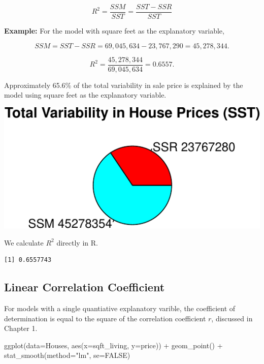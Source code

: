 \documentclass[
  letterpaper,
  DIV=11,
  numbers=noendperiod]{scrreprt}
\newenvironment{Shaded}{\begin{snugshade}}{\end{snugshade}}
\newcommand{\AttributeTok}[1]{\textcolor[rgb]{0.40,0.45,0.13}{#1}}
\newcommand{\ConstantTok}[1]{\textcolor[rgb]{0.56,0.35,0.01}{#1}}
\newcommand{\FunctionTok}[1]{\textcolor[rgb]{0.28,0.35,0.67}{#1}}
\newcommand{\NormalTok}[1]{\textcolor[rgb]{0.00,0.23,0.31}{#1}}
\newcommand{\SpecialCharTok}[1]{\textcolor[rgb]{0.37,0.37,0.37}{#1}}
\newcommand{\StringTok}[1]{\textcolor[rgb]{0.13,0.47,0.30}{#1}}
\begin{document}
\[
R^2=\frac{SSM}{SST}= \frac{SST-SSR}{SST}
\]

\textbf{Example:} For the model with square feet as the explanatory
variable,

\[
SSM = SST-SSR = 69,045,634 - 23,767,290 =45,278,344.
\]

\[
R^2 = \frac{45,278,344}{69,045,634}=0.6557.
\]

Approximately 65.6\% of the total variability in sale price is explained
by the model using square feet as the explanatory variable.

\includegraphics{Ch2_files/figure-pdf/unnamed-chunk-28-1.pdf}

We calculate \(R^2\) directly in R.

\begin{Shaded}
\end{Shaded}

\begin{verbatim}
[1] 0.6557743
\end{verbatim}

\subsection{Linear Correlation
Coefficient}\label{linear-correlation-coefficient}

For models with a single quantiative explanatory varible, the
coefficient of determination is equal to the square of the correlation
coefficient \(r\), discussed in Chapter 1.

\begin{Shaded}
\begin{Highlighting}[]
\FunctionTok{ggplot}\NormalTok{(}\AttributeTok{data=}\NormalTok{Houses, }\FunctionTok{aes}\NormalTok{(}\AttributeTok{x=}\NormalTok{sqft\_living, }\AttributeTok{y=}\NormalTok{price)) }\SpecialCharTok{+} \FunctionTok{geom\_point}\NormalTok{() }\SpecialCharTok{+} 
  \FunctionTok{stat\_smooth}\NormalTok{(}\AttributeTok{method=}\StringTok{"lm"}\NormalTok{, }\AttributeTok{se=}\ConstantTok{FALSE}\NormalTok{)}
\end{Highlighting}
\end{Shaded}
\end{document}
